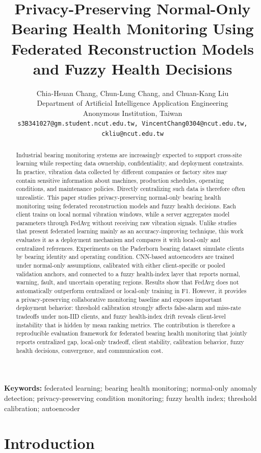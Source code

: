 \documentclass[11pt]{article}
\title{Privacy-Preserving Normal-Only Bearing Health Monitoring Using Federated Reconstruction Models and Fuzzy Health Decisions}
\author{
Chia-Hsuan Chang, Chun-Lung Chang, and Chuan-Kang Liu\\
Department of Artificial Intelligence Application Engineering\\
Anonymous Institution, Taiwan\\
\texttt{s3B341027@gm.student.ncut.edu.tw, VincentChang0304@ncut.edu.tw, ckliu@ncut.edu.tw}
}
\date{}
\begin{document}
\maketitle

\begin{abstract}
Industrial bearing monitoring systems are increasingly expected to support cross-site learning while respecting data ownership, confidentiality, and deployment constraints. In practice, vibration data collected by different companies or factory sites may contain sensitive information about machines, production schedules, operating conditions, and maintenance policies. Directly centralizing such data is therefore often unrealistic. This paper studies privacy-preserving normal-only bearing health monitoring using federated reconstruction models and fuzzy health decisions. Each client trains on local normal vibration windows, while a server aggregates model parameters through FedAvg without receiving raw vibration signals. Unlike studies that present federated learning mainly as an accuracy-improving technique, this work evaluates it as a deployment mechanism and compares it with local-only and centralized references. Experiments on the Paderborn bearing dataset simulate clients by bearing identity and operating condition. CNN-based autoencoders are trained under normal-only assumptions, calibrated with either client-specific or pooled validation anchors, and connected to a fuzzy health-index layer that reports normal, warning, fault, and uncertain operating regions. Results show that FedAvg does not automatically outperform centralized or local-only training in F1. However, it provides a privacy-preserving collaborative monitoring baseline and exposes important deployment behavior: threshold calibration strongly affects false-alarm and miss-rate tradeoffs under non-IID clients, and fuzzy health-index drift reveals client-level instability that is hidden by mean ranking metrics. The contribution is therefore a reproducible evaluation framework for federated bearing health monitoring that jointly reports centralized gap, local-only tradeoff, client stability, calibration behavior, fuzzy health decisions, convergence, and communication cost.
\end{abstract}

\noindent\textbf{Keywords:} federated learning; bearing health monitoring; normal-only anomaly detection; privacy-preserving condition monitoring; fuzzy health index; threshold calibration; autoencoder

\section{Introduction}
\end{document}
